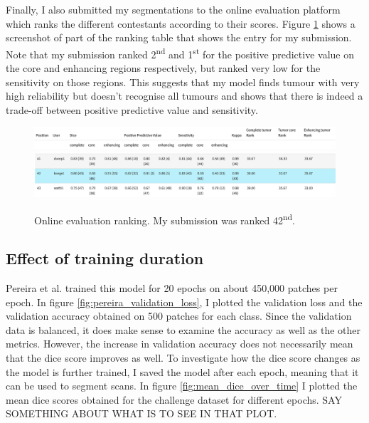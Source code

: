 \documentclass[12pt,a4paper,twoside,openright]{report}
\begin{document}
Finally, I also submitted my segmentations to the online evaluation platform which ranks the different contestants according to their scores. Figure \ref{fig:online_eval_rank} shows a screenshot of part of the ranking table that shows the entry for my submission. Note that my submission ranked 2\textsuperscript{nd} and 1\textsuperscript{st} for the positive predictive value on the core and enhancing regions respectively, but ranked very low for the sensitivity on those regions. This suggests that my model finds tumour with very high reliability but doesn't recognise all tumours and shows that there is indeed a trade-off between positive predictive value and sensitivity.

\begin{figure}
	\centering
	\label{fig:online_eval_rank}
	\includegraphics[width=\textwidth]{ranking_table_header}
	\includegraphics[width=\textwidth]{pereira_model_ranked_results}
	\caption{Online evaluation ranking. My submission was ranked 42\textsuperscript{nd}.}
\end{figure}

\subsection{Effect of training duration}
Pereira et al. trained this model for 20 epochs on about 450,000 patches per epoch. In figure \ref{fig:pereira_validation_loss}, I plotted the validation loss and the validation accuracy obtained on 500 patches for each class. Since the validation data is balanced, it does make sense to examine the accuracy as well as the other metrics. However, the increase in validation accuracy does not necessarily mean that the dice score improves as well. To investigate how the dice score changes as the model is further trained, I saved the model after each epoch, meaning that it can be used to segment scans. In figure \ref{fig:mean_dice_over_time} I plotted the mean dice scores obtained for the challenge dataset for different epochs. SAY SOMETHING ABOUT WHAT IS TO SEE IN THAT PLOT.
\end{document}
